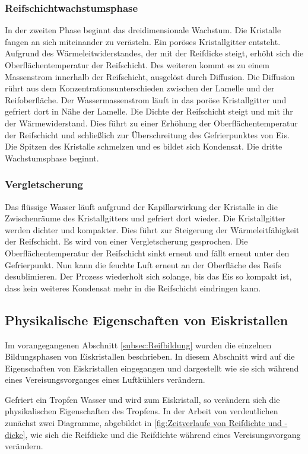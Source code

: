 \subsubsection*{Reifschichtwachstumsphase}
In der zweiten Phase beginnt das dreidimensionale Wachstum. Die Kristalle fangen an sich miteinander zu verästeln. Ein poröses Kristallgitter entsteht. Aufgrund des  Wärmeleitwiderstandes, der mit der Reifdicke steigt, erhöht sich die Oberflächentemperatur der Reifschicht. Des weiteren kommt es zu einem Massenstrom innerhalb der Reifschicht, ausgelöst durch Diffusion. Die Diffusion rührt aus  dem  Konzentrationsunterschieden zwischen der Lamelle und der Reifoberfläche. Der Wassermassenstrom läuft in das poröse Kristallgitter und gefriert dort in Nähe der Lamelle. Die Dichte der Reifschicht steigt und mit ihr der Wärmewiderstand. Dies führt zu einer Erhöhung der Oberflächentemperatur der Reifschicht und schließlich zur Überschreitung des Gefrierpunktes von Eis. Die Spitzen des Kristalle schmelzen und es bildet sich Kondensat. Die dritte Wachstumsphase beginnt. 

\subsubsection*{Vergletscherung}

Das flüssige Wasser läuft aufgrund der Kapillarwirkung der Kristalle in die Zwischenräume des Kristallgitters und gefriert dort wieder. Die Kristallgitter werden dichter und kompakter. Dies führt zur Steigerung der Wärmeleitfähigkeit der Reifschicht. Es wird von einer Vergletscherung gesprochen. Die Oberflächentemperatur der Reifschicht sinkt erneut und fällt erneut unter den Gefrierpunkt. Nun kann die feuchte Luft erneut an der Oberfläche des Reifs desublimieren. Der Prozess wiederholt sich solange, bis das Eis so kompakt ist, dass kein weiteres Kondensat mehr in die Reifschicht eindringen kann. 

\subsection*{Physikalische Eigenschaften von Eiskristallen}

 Im vorangegangenen Abschnitt \ref{subsec:Reifbildung} wurden die einzelnen Bildungsphasen von Eiskristallen beschrieben. In diesem Abschnitt wird auf die Eigenschaften von Eiskristallen eingegangen und dargestellt wie sie sich während eines Vereisungsvorganges eines Luftkühlers verändern. 
 
Gefriert ein Tropfen Wasser und wird zum Eiskristall, so verändern sich die physikalischen Eigenschaften des Tropfens. In der Arbeit von \textsc{\citeauthor{Schydlo2010}} verdeutlichen zunächst zwei Diagramme, abgebildet in \ref{fig:Zeitverlaufe von Reifdichte und -dicke}, wie sich die Reifdicke und die Reifdichte während eines Vereisungsvorgang verändern. 


